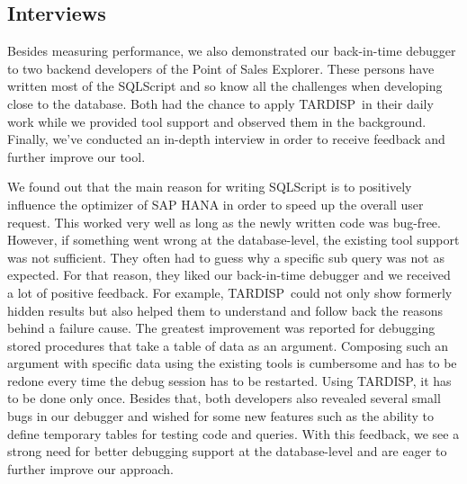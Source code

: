 \documentclass[english,conference]{IEEEtran}
\newcommand{\tool}{TAR\-DISP}
\begin{document}

\subsection{Interviews}

Besides measuring performance, we also demonstrated our back-in-time debugger to two backend developers of the Point of Sales Explorer. 
These persons have written most of the SQLScript and so know all the challenges when developing close to the database. 
Both had the chance to apply \tool\ in their daily work while we provided tool support and observed them in the background. 
Finally, we've conducted an in-depth interview in order to receive feedback and further improve our tool.

We found out that the main reason for writing SQLScript is to positively influence the optimizer of SAP HANA in order to speed up the overall user request.
This worked very well as long as the newly written code was bug-free. 
However, if something went wrong at the database-level, the existing tool support was not sufficient. 
They often had to guess why a specific sub query was not as expected. 
For that reason, they liked our back-in-time debugger and we received a lot of positive feedback.
For example, \tool\ could not only show formerly hidden results but also helped them to understand and follow back the reasons behind a failure cause. 
The greatest improvement was reported for debugging stored procedures that take a table of data as an argument.
Composing such an argument with specific data using the existing tools is cumbersome and has to be redone every time the debug session has to be restarted.
Using \tool, it has to be done only once.
Besides that, both developers also revealed several small bugs in our debugger and wished for some new features such as the ability to define temporary tables for testing code and queries.
With this feedback, we see a strong need for better debugging support at the database-level and are eager to further improve our approach.
\end{document}
